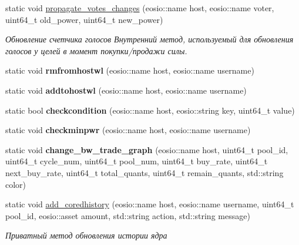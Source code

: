 \begin{DoxyCompactItemize}
static void \mbox{\hyperlink{classunicore_a9db4a730ab5cb5c91f4af22fcbe314fc}{propagate\+\_\+votes\+\_\+changes}} (eosio\+::name host, eosio\+::name voter, uint64\+\_\+t old\+\_\+power, uint64\+\_\+t new\+\_\+power)
\begin{DoxyCompactList}\small\item\em Обновление счетчика голосов Внутренний метод, используемый для обновления голосов у целей в момент покупки/продажи силы. \end{DoxyCompactList}\item 
\mbox{\label{classunicore_abcc8b6f0d5fabea652fb09b641ae1b87}} 
static void {\bfseries rmfromhostwl} (eosio\+::name host, eosio\+::name username)
\item 
\mbox{\label{classunicore_a6944e1980de8d07225c5dd4ee1157634}} 
static void {\bfseries addtohostwl} (eosio\+::name host, eosio\+::name username)
\item 
\mbox{\label{classunicore_a4b3c7544b822d31c8b826001ac1adaa2}} 
static bool {\bfseries checkcondition} (eosio\+::name host, eosio\+::string key, uint64\+\_\+t value)
\item 
\mbox{\label{classunicore_acdb13b5d90405d5626709be7f8a6152b}} 
static void {\bfseries checkminpwr} (eosio\+::name host, eosio\+::name username)
\item 
\mbox{\label{classunicore_a62e5a50f666b6406f7a786646091f529}} 
static void {\bfseries change\+\_\+bw\+\_\+trade\+\_\+graph} (eosio\+::name host, uint64\+\_\+t pool\+\_\+id, uint64\+\_\+t cycle\+\_\+num, uint64\+\_\+t pool\+\_\+num, uint64\+\_\+t buy\+\_\+rate, uint64\+\_\+t next\+\_\+buy\+\_\+rate, uint64\+\_\+t total\+\_\+quants, uint64\+\_\+t remain\+\_\+quants, std\+::string color)
\item 
\mbox{\label{classunicore_a666299956a0903dec8e26b1c5b9b24a9}} 
static void \mbox{\hyperlink{classunicore_a666299956a0903dec8e26b1c5b9b24a9}{add\+\_\+coredhistory}} (eosio\+::name host, eosio\+::name username, uint64\+\_\+t pool\+\_\+id, eosio\+::asset amount, std\+::string action, std\+::string message)
\begin{DoxyCompactList}\small\item\em Приватный метод обновления истории ядра \end{DoxyCompactList}\item 

\end{DoxyCompactItemize}
